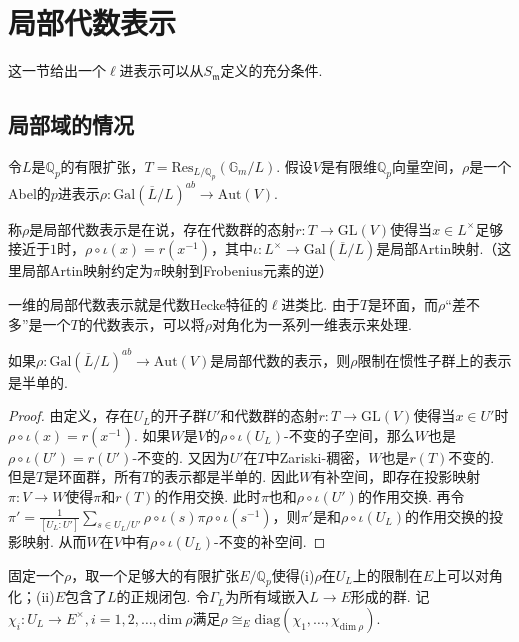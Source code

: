 \section{局部代数表示}

这一节给出一个$\ell$进表示可以从$S_{\mathfrak{m}}$定义的充分条件.

\subsection{局部域的情况}
令$L$是$\mathbb{Q}_p$的有限扩张，$T = \mathrm{Res}_{L/\mathbb{Q}_p}(\mathbb{G}_m / L)$.
假设$V$是有限维$\mathbb{Q}_p$向量空间，$\rho$是一个Abel的$p$进表示$\rho: \mathrm{Gal}(\overline{L}/L)^{ab} \to \mathrm{Aut}(V)$.

\begin{cdef}
    称$\rho$是局部代数表示是在说，存在代数群的态射$r:T\to \mathrm{GL}(V)$使得当$x\in L^{\times}$足够接近于$1$时，$\rho\circ \iota(x) = r(x^{-1})$，其中$\iota: L^{\times}\to \mathrm{Gal}(\overline{L}/L) $是局部Artin映射.（这里局部Artin映射约定为$\pi$映射到Frobenius元素的逆）
\end{cdef}

一维的局部代数表示就是代数Hecke特征的$\ell$进类比. 由于$T$是环面，而$\rho$“差不多”是一个$T$的代数表示，可以将$\rho$对角化为一系列一维表示来处理.

\begin{cprop}
    如果$\rho: \mathrm{Gal}(\overline{L}/L)^{ab} \to \mathrm{Aut}(V)$是局部代数的表示，则$\rho$限制在惯性子群上的表示是半单的.
\end{cprop}

\begin{proof}
    由定义，存在$U_L$的开子群$U'$和代数群的态射$r: T\to \mathrm{GL}(V)$使得当$x\in U'$时$\rho\circ \iota(x) = r(x^{-1})$. 如果$W$是$V$的$\rho\circ\iota(U_L)$-不变的子空间，那么$W$也是$\rho\circ\iota(U')=r(U')$-不变的. 又因为$U'$在$T$中Zariski-稠密，$W$也是$r(T)$不变的. 但是$T$是环面群，所有$T$的表示都是半单的. 因此$W$有补空间，即存在投影映射$\pi: V\to W$使得$\pi$和$r(T)$的作用交换. 此时$\pi$也和$\rho\circ\iota(U')$的作用交换. 再令$\pi' = \frac{1}{[U_L:U']} \sum_{s\in U_L/U'} \rho\circ \iota(s) \pi \rho\circ \iota(s^{-1})$，则$\pi'$是和$\rho\circ\iota(U_L)$的作用交换的投影映射. 从而$W$在$V$中有$\rho\circ\iota(U_L)$-不变的补空间.
\end{proof}

固定一个$\rho$，取一个足够大的有限扩张$E/\mathbb{Q}_p$使得(i)$\rho$在$U_L$上的限制在$E$上可以对角化；(ii)$E$包含了$L$的正规闭包. 令$\Gamma_{L}$为所有域嵌入$L\to E$形成的群. 记$\chi_i: U_L\to E^{\times}, i=1,2,\ldots,\mathrm{dim}\ \rho$满足$\rho \cong_{E} \mathrm{diag}(\chi_1,\ldots, \chi_{\mathrm{dim}\ \rho})$.

